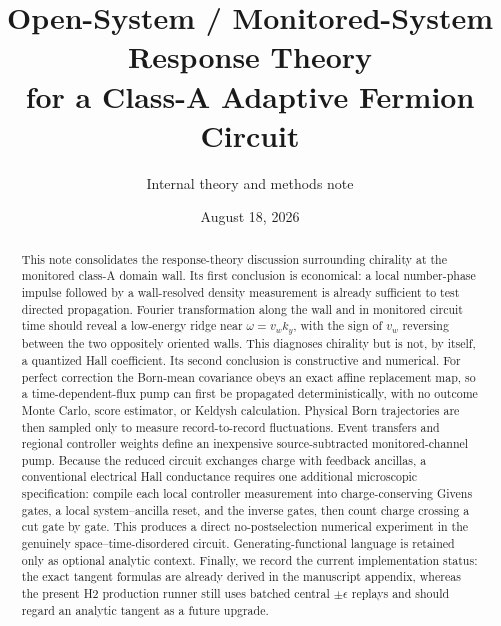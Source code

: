 \documentclass[aps,prb,onecolumn,nofootinbib,superscriptaddress]{revtex4-2}
\begin{document}
\title{\texorpdfstring{Open-System / Monitored-System Response Theory\\
for a Class-A Adaptive Fermion Circuit}%
{Open-System / Monitored-System Response Theory for a Class-A Adaptive Fermion Circuit}}
\author{Internal theory and methods note}
\date{August 18, 2026}

\begin{abstract}
This note consolidates the response-theory discussion surrounding chirality at
the monitored class-A domain wall.  Its first conclusion is economical: a local
number-phase impulse followed by a wall-resolved density measurement is already
sufficient to test directed propagation.  Fourier transformation along the
wall and in monitored circuit time should reveal a low-energy ridge near
$\omega=v_w k_y$, with the sign of $v_w$ reversing between the two oppositely
oriented walls.  This diagnoses chirality but is not, by itself, a quantized
Hall coefficient.  Its second conclusion is constructive and numerical.  For
perfect correction the Born-mean covariance obeys an exact affine replacement
map, so a time-dependent-flux pump can first be propagated deterministically,
with no outcome Monte Carlo, score estimator, or Keldysh calculation.  Physical
Born trajectories are then sampled only to measure record-to-record
fluctuations.  Event transfers and regional controller weights define an
inexpensive source-subtracted monitored-channel pump.  Because the reduced
circuit exchanges charge with feedback ancillas, a conventional electrical
Hall conductance requires one additional microscopic specification: compile
each local controller measurement into charge-conserving Givens gates, a local
system--ancilla reset, and the inverse gates, then count charge crossing a cut
gate by gate.  This produces a direct no-postselection numerical experiment in
the genuinely space--time-disordered circuit.  Generating-functional language
is retained only as optional analytic context.  Finally, we record the current
implementation status: the exact tangent formulas are already derived in the
manuscript appendix, whereas the present H2 production runner still uses
batched central $\pm\epsilon$ replays and should regard an analytic tangent as
a future upgrade.
\end{abstract}

\maketitle
\setcounter{tocdepth}{2}
\tableofcontents
\end{document}
